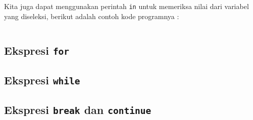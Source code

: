 Kita juga dapat menggunakan perintah \texttt{in} untuk memeriksa nilai dari variabel yang diseleksi, berikut adalah contoh kode programnya :

\begin{lstlisting}
\end{lstlisting}

\subsection{Ekspresi \texttt{for}}

\subsection{Ekspresi \texttt{while}}

\subsection{Ekspresi \texttt{break} dan \texttt{continue}}

